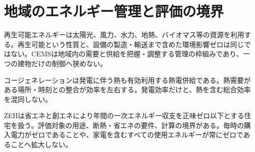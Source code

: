 \section{地域のエネルギー管理と評価の境界}
\label{theory:sustainability:energyterms}
再生可能エネルギーは太陽光、風力、水力、地熱、バイオマス等の資源を利用する。再生可能という性質と、設備の製造・輸送まで含めた環境影響ゼロは同じではない。CEMSは地域内の需要と供給を把握・調整する管理の枠組みであり、一つの建物だけの制御へ狭めない。

コージェネレーションは発電に伴う熱も有効利用する熱電併給である。熱需要がある場所・時刻との整合が効率を左右する\parencite{eth54_cogen2018}。発電効率だけと、熱を含む総合効率を混同しない。

ZEHは省エネと創エネにより年間の一次エネルギー収支を正味ゼロ以下とする住宅を扱う\parencite{eth54_zeh2018}。評価対象の用途、断熱・省エネの要件、計算の境界がある。毎時の購入電力がゼロであることや、家電を含むすべての使用エネルギーが常にゼロであることへ拡大しない。
